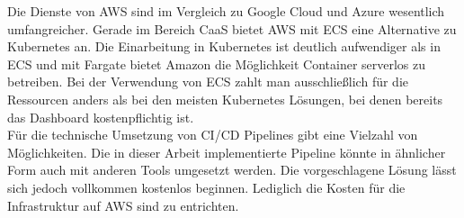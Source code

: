 Die Dienste von AWS sind im Vergleich zu Google Cloud und Azure wesentlich umfangreicher.
Gerade im Bereich CaaS bietet AWS mit ECS eine Alternative zu Kubernetes an.
Die Einarbeitung in Kubernetes ist deutlich aufwendiger als in ECS und mit Fargate bietet Amazon die Möglichkeit Container serverlos zu betreiben.
Bei der Verwendung von ECS zahlt man ausschließlich für die Ressourcen anders als bei den meisten Kubernetes Lösungen, bei denen bereits das Dashboard kostenpflichtig ist. \\

Für die technische Umsetzung von CI/CD Pipelines gibt eine Vielzahl von Möglichkeiten.
Die in dieser Arbeit implementierte Pipeline könnte in ähnlicher Form auch mit anderen Tools umgesetzt werden.
Die vorgeschlagene Lösung lässt sich jedoch vollkommen kostenlos beginnen.
Lediglich die Kosten für die Infrastruktur auf AWS sind zu entrichten.



